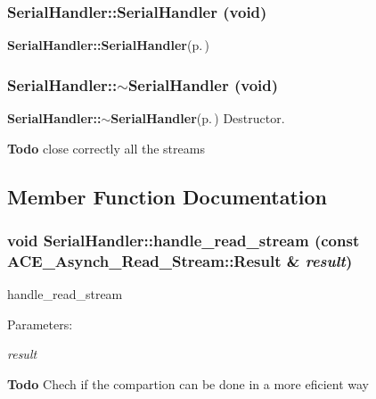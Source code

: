 \subsubsection{\setlength{\rightskip}{0pt plus 5cm}Serial\-Handler::Serial\-Handler (void)}\label{classSerialHandler_a0}


{\bf Serial\-Handler::Serial\-Handler}{\rm (p.\,\pageref{classSerialHandler_a0})} 
\subsubsection{\setlength{\rightskip}{0pt plus 5cm}Serial\-Handler::$\sim${\bf Serial\-Handler} (void)}\label{classSerialHandler_a1}


{\bf Serial\-Handler::$\sim$Serial\-Handler}{\rm (p.\,\pageref{classSerialHandler_a1})} Destructor. 

\begin{Desc}
\item[{\bf Todo}]close correctly all the streams \end{Desc}


\subsection{Member Function Documentation}
\subsubsection{\setlength{\rightskip}{0pt plus 5cm}void Serial\-Handler::handle\_\-read\_\-stream (const ACE\_\-Asynch\_\-Read\_\-Stream::Result \& {\em result})\hspace{0.3cm}{\tt  [protected, virtual]}}\label{classSerialHandler_b0}


handle\_\-read\_\-stream

\begin{Desc}
\item[Parameters:]
\begin{description}
\item[{\em result}]\end{description}
\end{Desc}


\begin{Desc}
\item[{\bf Todo}]Chech if the compartion can be done in a more eficient way \end{Desc}
